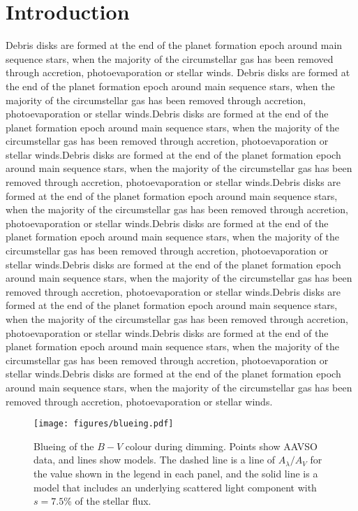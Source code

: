 \documentclass{aa}
\begin{document}
   \section{Introduction}

Debris disks are formed at the end of the planet formation epoch around main sequence stars, when the majority of the circumstellar gas has been removed through accretion, photoevaporation or stellar winds.
%
Debris disks are formed at the end of the planet formation epoch around main sequence stars, when the majority of the circumstellar gas has been removed through accretion, photoevaporation or stellar winds.Debris disks are formed at the end of the planet formation epoch around main sequence stars, when the majority of the circumstellar gas has been removed through accretion, photoevaporation or stellar winds.Debris disks are formed at the end of the planet formation epoch around main sequence stars, when the majority of the circumstellar gas has been removed through accretion, photoevaporation or stellar winds.Debris disks are formed at the end of the planet formation epoch around main sequence stars, when the majority of the circumstellar gas has been removed through accretion, photoevaporation or stellar winds.Debris disks are formed at the end of the planet formation epoch around main sequence stars, when the majority of the circumstellar gas has been removed through accretion, photoevaporation or stellar winds.Debris disks are formed at the end of the planet formation epoch around main sequence stars, when the majority of the circumstellar gas has been removed through accretion, photoevaporation or stellar winds.Debris disks are formed at the end of the planet formation epoch around main sequence stars, when the majority of the circumstellar gas has been removed through accretion, photoevaporation or stellar winds.Debris disks are formed at the end of the planet formation epoch around main sequence stars, when the majority of the circumstellar gas has been removed through accretion, photoevaporation or stellar winds.Debris disks are formed at the end of the planet formation epoch around main sequence stars, when the majority of the circumstellar gas has been removed through accretion, photoevaporation or stellar winds.

\begin{figure*}
    \centering
    \texttt{[image: figures/blueing.pdf]}
    \caption{Blueing of the $B-V$ colour during dimming.
    Points show AAVSO data, and lines show models.
    The dashed line is a line of $A_\lambda/A_V$ for the value shown in the legend in each panel, and the solid line is a model that includes an underlying scattered light component with $s=7.5$\% of the stellar flux.}
    \label{fig:blueing}
\end{figure*}
\end{document}
